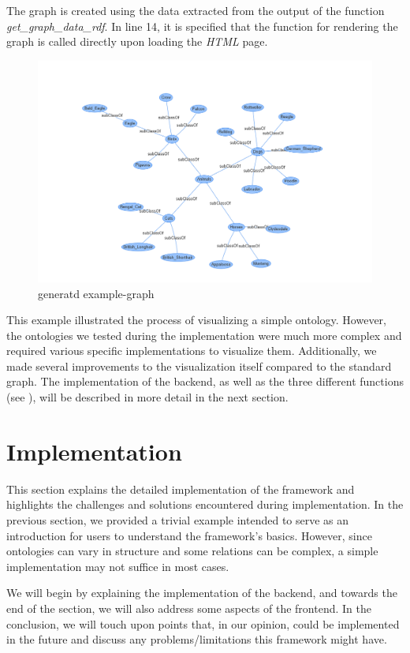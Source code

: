 The graph is created using the data extracted from the output of the function 
\textit{get\_graph\_data\_rdf}. In line 14, it is specified that the function for rendering the graph is called directly upon loading the \textit{HTML} page.

\begin{figure}[H]
    \includegraphics[scale=0.45]{Graphics/simple_graph.png}
    \caption{generatd example-graph}
\end{figure}


This example illustrated the process of visualizing a simple ontology. However, the ontologies we tested during the implementation were much more complex and required various specific implementations to visualize them. Additionally, we made several improvements to the visualization itself compared to the standard graph. The implementation of the backend, as well as the three different functions (see ), will be described in more detail in the next section.
\section{Implementation}
\label{sec:Implementation}

This section explains the detailed implementation of the framework and highlights the challenges and solutions encountered during implementation. In the previous section, we provided a trivial example intended to serve as an introduction for users to understand the framework's basics. However, since ontologies can vary in structure and some relations can be complex, a simple implementation may not suffice in most cases.

We will begin by explaining the implementation of the backend, and towards the end of the section, we will also address some aspects of the frontend. In the conclusion, we will touch upon points that, in our opinion, could be implemented in the future and discuss any problems/limitations this framework might have.
